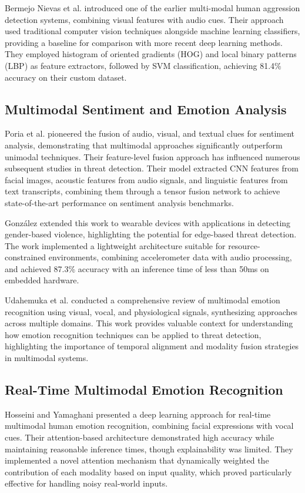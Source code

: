 \documentclass[conference,compsoc]{IEEEtran}
\begin{document}
Bermejo Nievas et al. \cite{bermejo2016} introduced one of the earlier multi-modal human aggression detection systems, combining visual features with audio cues. Their approach used traditional computer vision techniques alongside machine learning classifiers, providing a baseline for comparison with more recent deep learning methods. They employed histogram of oriented gradients (HOG) and local binary patterns (LBP) as feature extractors, followed by SVM classification, achieving 81.4\% accuracy on their custom dataset.

\subsection{Multimodal Sentiment and Emotion Analysis}
Poria et al. \cite{poria2016} pioneered the fusion of audio, visual, and textual clues for sentiment analysis, demonstrating that multimodal approaches significantly outperform unimodal techniques. Their feature-level fusion approach has influenced numerous subsequent studies in threat detection. Their model extracted CNN features from facial images, acoustic features from audio signals, and linguistic features from text transcripts, combining them through a tensor fusion network to achieve state-of-the-art performance on sentiment analysis benchmarks.

González \cite{gonzalez2022} extended this work to wearable devices with applications in detecting gender-based violence, highlighting the potential for edge-based threat detection. The work implemented a lightweight architecture suitable for resource-constrained environments, combining accelerometer data with audio processing, and achieved 87.3\% accuracy with an inference time of less than 50ms on embedded hardware.

Udahemuka et al. \cite{udahemuka2024} conducted a comprehensive review of multimodal emotion recognition using visual, vocal, and physiological signals, synthesizing approaches across multiple domains. This work provides valuable context for understanding how emotion recognition techniques can be applied to threat detection, highlighting the importance of temporal alignment and modality fusion strategies in multimodal systems.

\subsection{Real-Time Multimodal Emotion Recognition}
Hosseini and Yamaghani \cite{hosseini2024} presented a deep learning approach for real-time multimodal human emotion recognition, combining facial expressions with vocal cues. Their attention-based architecture demonstrated high accuracy while maintaining reasonable inference times, though explainability was limited. They implemented a novel attention mechanism that dynamically weighted the contribution of each modality based on input quality, which proved particularly effective for handling noisy real-world inputs.
\end{document}
